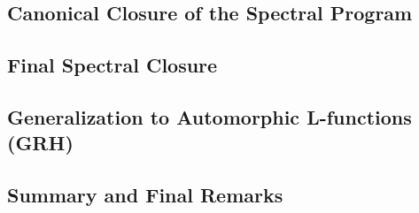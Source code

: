 


\subsection{Canonical Closure of the Spectral Program}
\label{sec:canonical_closure}




\subsection{Final Spectral Closure}
\label{sec:spectral_final_closure}







\subsection{Generalization to Automorphic L-functions (GRH)}
\label{sec:grh_equivalence}










\subsection{Summary and Final Remarks}
\label{sec:spectral_summary}




